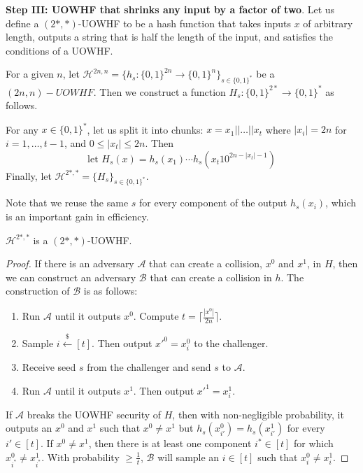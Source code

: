 \documentclass[12pt]{tufte-book}
\newcommand{\getsr}{\xleftarrow{\$}}
\newcommand{\bit}{\{0,1\}}
\begin{document}
\noindent\textbf{Step III: UOWHF that shrinks any input by a factor of two}.
Let us define a $(2{*}, {*})$-UOWHF to be a hash function that takes inputs $x$ of arbitrary length, outputs a string that is half the length of the input, and satisfies the conditions of a UOWHF.

\begin{construction}[a $(2{*}, {*})$-UOWHF]
    For a given $n$, let $\mathcal{H}^{2n, n} = \{h_s:\bit^{2n}\rightarrow\bit^{n}\}_{s\in\bit^{*}}$ be a $(2n, n)-UOWHF$. Then we construct a function $H_s:\bit^{2*} \to \bit^*$ as follows. 

    For any $x \in \bit^*$, let us split it into chunks: $x=x_1 || \dots || x_t$ where $|x_i|=2n$ for $i=1,\dots,t-1$, and $0\leq|x_t|\leq 2n$. Then
    \[
    \text{let } H_s(x)=h_s(x_1)\cdots h_s(x_{t}10^{2n-|x_t|-1})
    \]
    Finally, let $\mathcal{H}^{2*, *} = \{H_s\}_{s \in \bit^*}$.
\end{construction}
Note that we reuse the same $s$ for every component of the output $h_s(x_i)$, which is an important gain in efficiency.

\begin{claim}
    $\mathcal{H}^{2*, *}$ is a $(2{*}, {*})$-UOWHF.
\end{claim}
\begin{proof}
If there is an adversary $\mathcal{A}$ that can create a collision, $x^0$ and $x^1$, in $H$, then we can construct an adversary $\mathcal{B}$ that can create a collision in $h$. The construction of $\mathcal{B}$ is as follows:
\begin{enumerate}
    \item Run $\mathcal{A}$ until it outputs $x^0$. Compute $t = \lceil\frac{|x^0|}{2n}\rceil$.
    \item Sample $i \getsr [t]$. Then output $x'^0 = x^0_{i}$ to the challenger.
    \item Receive seed $s$ from the challenger and send $s$ to $\mathcal{A}$.
    \item Run $\mathcal{A}$ until it outputs $x^1$. Then output $x'^1 = x^1_{i}$.
\end{enumerate}

If $\mathcal{A}$ breaks the UOWHF security of $H$, then with non-negligible probability, it outputs an $x^0$ and $x^1$ such that $x^0 \neq x^1$ but $h_s(x^0_{i'})=h_s(x^1_{i'})$ for every $i' \in [t]$. If $x^0 \neq x^1$, then there is at least one component $i^* \in [t]$ for which $x^0_{i^*} \neq x^1_{i^*}$. With probability $\geq \frac{1}{t}$, $\mathcal{B}$ will sample an $i \in [t]$ such that $x^0_{i} \neq x^1_{i}$.
\end{proof}
\vspace{5mm}
\end{document}
